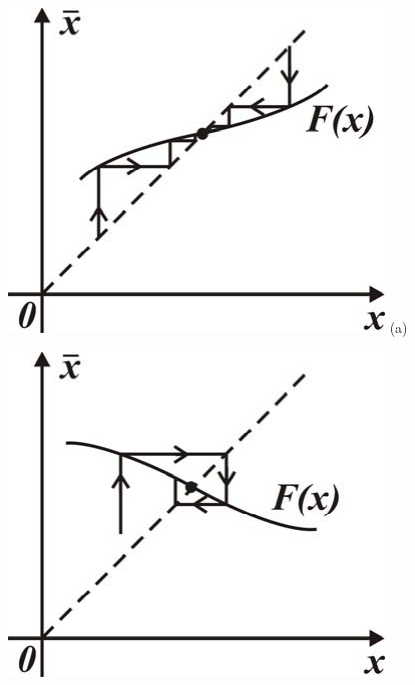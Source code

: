\begin{figure}[h]
        \centering
        \begin{minipage}{0.49\linewidth}
                \centering
                \includegraphics[width=\linewidth]{fig/lect6/5a}
                (a)
        \end{minipage}
        \begin{minipage}{0.49\linewidth}
                \centering
                \includegraphics[width=\linewidth]{fig/lect6/5b}

\end{minipage}
\end{figure}
